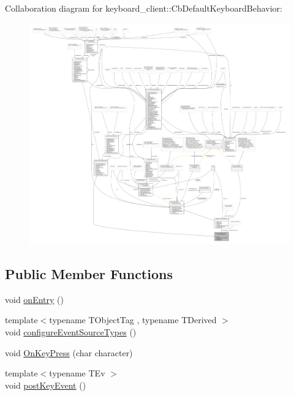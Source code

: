Collaboration diagram for keyboard\+\_\+client\+:\+:Cb\+Default\+Keyboard\+Behavior\+:
\nopagebreak
\begin{figure}[H]
\begin{center}
\leavevmode
\includegraphics[width=350pt]{classkeyboard__client_1_1CbDefaultKeyboardBehavior__coll__graph}
\end{center}
\end{figure}
\subsection*{Public Member Functions}
\begin{DoxyCompactItemize}
\item 
void \hyperlink{classkeyboard__client_1_1CbDefaultKeyboardBehavior_a1ac673a9d9a733215f665810d6cf69aa}{on\+Entry} ()
\item 
{\footnotesize template$<$typename T\+Object\+Tag , typename T\+Derived $>$ }\\void \hyperlink{classkeyboard__client_1_1CbDefaultKeyboardBehavior_a70465c0886d118d226d136a4acc63ef3}{configure\+Event\+Source\+Types} ()
\item 
void \hyperlink{classkeyboard__client_1_1CbDefaultKeyboardBehavior_ae6b6fa6b648a503f2a55eccde8556daa}{On\+Key\+Press} (char character)
\item 
{\footnotesize template$<$typename T\+Ev $>$ }\\void \hyperlink{classkeyboard__client_1_1CbDefaultKeyboardBehavior_ae02c14e58b7348af59f3f82bfadbbbdd}{post\+Key\+Event} ()
\end{DoxyCompactItemize}
